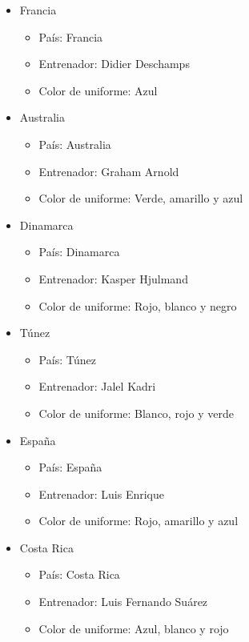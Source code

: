 \begin{itemize}
\begin{itemize}
        \end{itemize}
    \item Francia
        \begin{itemize}
            \item País: Francia
            \item Entrenador: Didier Deschamps
            \item Color de uniforme: Azul
        \end{itemize}
    \item Australia
        \begin{itemize}
            \item País: Australia
            \item Entrenador: Graham Arnold
            \item Color de uniforme: Verde, amarillo y azul
        \end{itemize}
    \item Dinamarca
        \begin{itemize}
            \item País: Dinamarca
            \item Entrenador: Kasper Hjulmand
            \item Color de uniforme: Rojo, blanco y negro
        \end{itemize}
    \item Túnez
        \begin{itemize}
            \item País: Túnez
            \item Entrenador: Jalel Kadri
            \item Color de uniforme: Blanco, rojo y verde
        \end{itemize}
    \item España
        \begin{itemize}
            \item País: España
            \item Entrenador: Luis Enrique
            \item Color de uniforme: Rojo, amarillo y azul
        \end{itemize}
    \item Costa Rica
        \begin{itemize}
            \item País: Costa Rica
            \item Entrenador: Luis Fernando Suárez
            \item Color de uniforme: Azul, blanco y rojo

\end{itemize}
\end{itemize}

